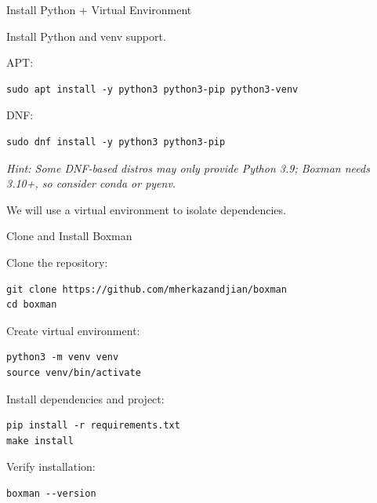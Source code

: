 \documentclass[aspectratio=169]{beamer}
\begin{document}
\begin{frame}[fragile]{Install Python + Virtual Environment}

Install Python and venv support.

APT:

\begin{lstlisting}
sudo apt install -y python3 python3-pip python3-venv
\end{lstlisting}

DNF:

\begin{lstlisting}
sudo dnf install -y python3 python3-pip
\end{lstlisting}
\vspace{-0.4em}
{\footnotesize\color{black!60}\textit{Hint: Some DNF-based distros may only provide Python 3.9; Boxman needs 3.10+, so consider conda or pyenv.}}

\vspace{0.4em}
We will use a virtual environment to isolate dependencies.

\end{frame}


\begin{frame}[fragile]{Clone and Install Boxman}

Clone the repository:

\begin{lstlisting}
git clone https://github.com/mherkazandjian/boxman
cd boxman
\end{lstlisting}

Create virtual environment:

\begin{lstlisting}
python3 -m venv venv
source venv/bin/activate
\end{lstlisting}

Install dependencies and project:

\begin{lstlisting}
pip install -r requirements.txt
make install
\end{lstlisting}

Verify installation:

\begin{lstlisting}
boxman --version
\end{lstlisting}

\end{frame}

\end{document}
